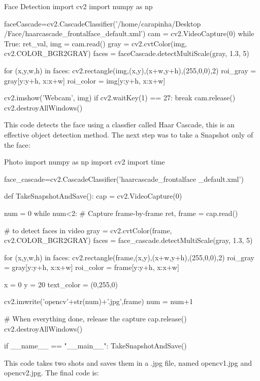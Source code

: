 \documentclass[12pt]{article}
\begin{document}
\begin{codelisting}{Face Detection}
import cv2
import numpy as np

faceCascade=cv2.CascadeClassifier('/home/carapinha/Desktop
/Face/haarcascade_frontalface_default.xml')
cam = cv2.VideoCapture(0)
while True:
	ret_val, img = cam.read()
	gray = cv2.cvtColor(img, cv2.COLOR_BGR2GRAY)
	faces = faceCascade.detectMultiScale(gray, 1.3, 5)

	for (x,y,w,h) in faces:
	        cv2.rectangle(img,(x,y),(x+w,y+h),(255,0,0),2)
	        roi_gray = gray[y:y+h, x:x+w]
	        roi_color = img[y:y+h, x:x+w]

	cv2.imshow('Webcam', img)
	if cv2.waitKey(1) == 27: 
		break
cam.release()
cv2.destroyAllWindows()
\end{codelisting}

This code detects the face using a classfier called Haar Cascade, this is an effective object detection method. The next step was to take a Snapshot only of the face:

\begin{codelisting}{Photo}
import numpy as np
import cv2
import time

face_cascade=cv2.CascadeClassifier('haarcascade_frontalface
_default.xml')

def TakeSnapshotAndSave():
    cap = cv2.VideoCapture(0)

    num = 0 
    while num<2:
        # Capture frame-by-frame
        ret, frame = cap.read()

        # to detect faces in video
        gray = cv2.cvtColor(frame, cv2.COLOR_BGR2GRAY)
        faces = face_cascade.detectMultiScale(gray, 1.3, 5)

        for (x,y,w,h) in faces:
            cv2.rectangle(frame,(x,y),(x+w,y+h),(255,0,0),2)
            roi_gray = gray[y:y+h, x:x+w]
            roi_color = frame[y:y+h, x:x+w]

        x = 0
        y = 20
        text_color = (0,255,0)

        cv2.imwrite('opencv'+str(num)+'.jpg',frame)
        num = num+1

    # When everything done, release the capture
    cap.release()
    cv2.destroyAllWindows()


if __name__ == "__main__":
    TakeSnapshotAndSave()

\end{codelisting}
This code takes two shots and saves them in a .jpg file, named opencv1.jpg and opencv2.jpg. The final code is:
\end{document}
